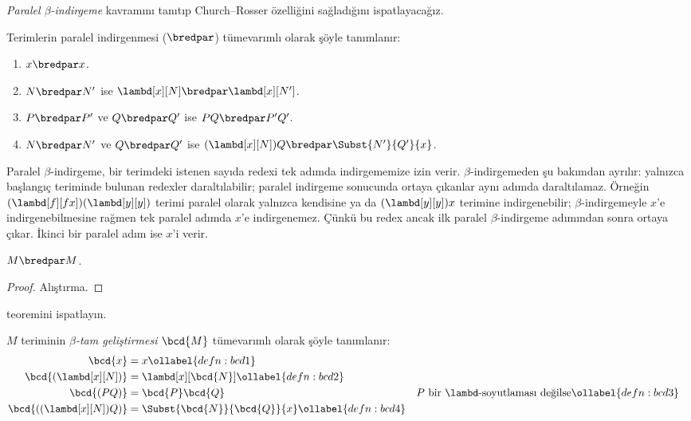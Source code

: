 \documentclass[../../../include/open-logic-section]{subfiles}
\begin{document}


\emph{Paralel $\beta$-indirgeme} kavramını tanıtıp Church--Rosser özelliğini
sağladığını ispatlayacağız.

\begin{defn} 
  Terimlerin paralel indirgenmesi ($\bredpar$) tümevarımlı olarak şöyle
  tanımlanır:
  \begin{enumerate}
    \item {} $x \bredpar x$.
    \item {} $N \bredpar N'$ ise
      $\lambd[x][N] \bredpar \lambd[x][N']$.
    \item {} $P \bredpar P'$ ve $Q \bredpar Q'$ ise
      $PQ \bredpar P'Q'$.
    \item {} $N \bredpar N'$ ve $Q \bredpar Q'$ ise
      $(\lambd[x][N])Q \bredpar \Subst{N'}{Q'}{x}$.
  \end{enumerate}
\end{defn}

Paralel $\beta$-indirgeme, bir terimdeki istenen sayıda redexi tek adımda
indirgememize izin verir. $\beta$-indirgemeden şu bakımdan ayrılır: yalnızca
başlangıç teriminde bulunan redexler daraltılabilir; paralel indirgeme
sonucunda ortaya çıkanlar aynı adımda daraltılamaz. Örneğin
$(\lambd[f][fx])(\lambd[y][y])$ terimi paralel olarak yalnızca kendisine ya
da $(\lambd[y][y])x$ terimine indirgenebilir; $\beta$-indirgemeyle $x$'e
indirgenebilmesine rağmen tek paralel adımda $x$'e indirgenemez. Çünkü bu
redex ancak ilk paralel $\beta$-indirgeme adımından sonra ortaya çıkar. İkinci
bir paralel adım ise $x$'i verir.

\begin{thm}
  $M \bredpar M$.
\end{thm}

\begin{proof}
  Alıştırma.
\end{proof}

\begin{prob}
   teoremini ispatlayın.
\end{prob}

\begin{defn}
  $M$ teriminin \emph{$\beta$-tam geliştirmesi} $\bcd{M}$ tümevarımlı olarak
  şöyle tanımlanır:
  \begin{align}
    \bcd{x} &= x \ollabel{defn:bcd1} \\
    \bcd{(\lambd[x][N])} &= \lambd[x][\bcd{N}] \ollabel{defn:bcd2}\\
    \bcd{(PQ)} &= \bcd{P}\bcd{Q} && \text{$P$ bir $\lambd$-soyutlaması değilse}
    \ollabel{defn:bcd3} \\
    \bcd{((\lambd[x][N])Q)} &= \Subst{\bcd{N}}{\bcd{Q}}{x} \ollabel{defn:bcd4}
  \end{align}
\end{defn}
\end{document}
